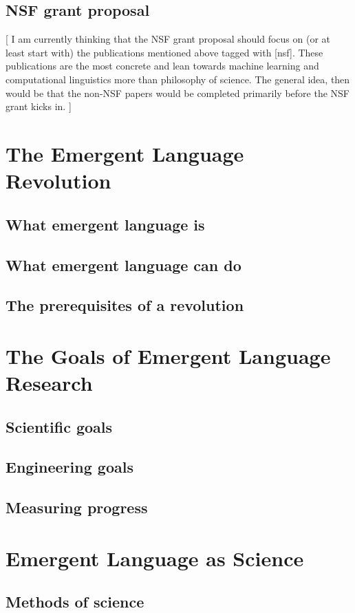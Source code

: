 \documentclass[letterpaper]{report}
\newcommand\bjb[1]{{\color{blue}[#1]}}
\newcommand\cmg[1]{{\color{gray}[#1]}}
\begin{document}
\section{NSF grant proposal}
\bjb{%
I am currently thinking that the NSF grant proposal should focus on (or at least start with) the publications mentioned above tagged with \cmg{nsf}.
These publications are the most concrete and lean towards machine learning and computational linguistics more than philosophy of science.
The general idea, then would be that the non-NSF papers would be completed primarily before the NSF grant kicks in.%
}

\chapter{The Emergent Language Revolution}
\section{What emergent language is}
\section{What emergent language can do}
\section{The prerequisites of a revolution}

\chapter{The Goals of Emergent Language Research}
\section{Scientific goals}
\section{Engineering goals}
\section{Measuring progress}

\chapter{Emergent Language as Science}
\section{Methods of science}
\end{document}
